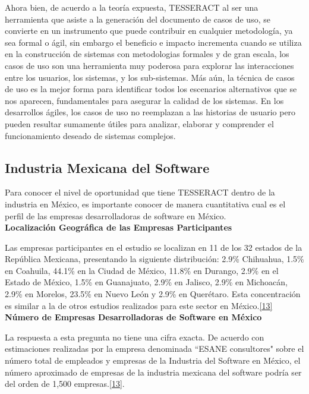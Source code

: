 Ahora bien, de acuerdo a la teoría expuesta, TESSERACT al ser una herramienta que asiste a la generación del documento de casos de uso, se convierte en un instrumento que puede contribuir en cualquier metodología, ya sea formal o ágil, sin embargo el beneficio e impacto incrementa cuando se utiliza en la construcción de sistemas con metodologias formales y de gran escala, los casos de uso son una herramienta muy poderosa para explorar las interacciones entre los usuarios, los sistemas, y los sub-sistemas. Más aún, la técnica de casos de uso es la mejor forma para identificar todos los escenarios alternativos que se nos aparecen, fundamentales para asegurar la calidad de los sistemas. En los desarrollos ágiles, los casos de uso no reemplazan a las historias de usuario pero pueden resultar sumamente útiles para analizar, elaborar y comprender el funcionamiento deseado de sistemas complejos.

\subsection{Industria Mexicana del Software}

Para conocer el nivel de oportunidad que tiene TESSERACT dentro de la industria en México, es importante conocer de manera cuantitativa cual es el perfil de las empresas desarrolladoras de software en México.\\

\textbf{Localización Geográfica de las Empresas Participantes}
 
Las empresas participantes en el estudio se localizan en 11 de los 32 estados de la República Mexicana, presentando la siguiente distribución: 2.9\% Chihuahua, 1.5\%  en Coahuila, 44.1\%  en la Ciudad de México, 11.8\%  en Durango, 2.9\%  en el Estado de México, 1.5\%  en Guanajuato, 2.9\%  en Jalisco, 2.9\%  en Michoacán, 2.9\%  en Morelos, 23.5\%  en Nuevo León y 2.9\%  en Querétaro. Esta concentración es similar a la de otros estudios realizados para este sector en México.\hyperlink{b13}{[13]}\\

\textbf{Número de Empresas Desarrolladoras de Software en México}

La respuesta a esta pregunta no tiene una cifra exacta. De acuerdo con estimaciones realizadas por la empresa denominada ``ESANE consultores" sobre el número total de empleados y empresas de la Industria del Software en México, el número aproximado de empresas de la industria mexicana del software podría ser del orden de 1,500 empresas.\hyperlink{b13}{[13]}.\\
 
